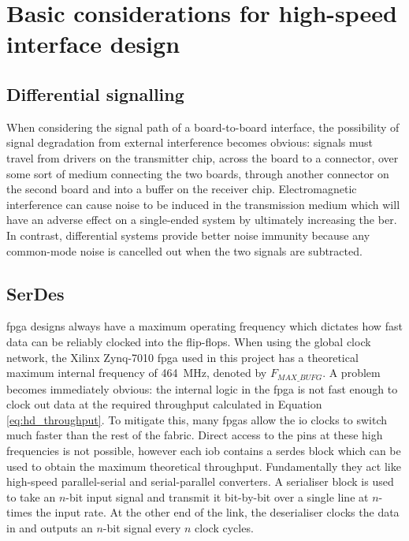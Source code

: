 
\section{Basic considerations for high-speed interface design}

\subsection{Differential signalling}

When considering the signal path of a board-to-board interface, the possibility of signal degradation from external interference becomes obvious: signals must travel from drivers on the transmitter chip, across the board to a connector, over some sort of medium connecting the two boards, through another connector on the second board and into a buffer on the receiver chip. Electromagnetic interference can cause noise to be induced in the transmission medium which will have an adverse effect on a single-ended system by ultimately increasing the \gls{ber}. In contrast, differential systems provide better noise immunity because any common-mode noise is cancelled out when the two signals are subtracted.


\subsection{SerDes}

\gls{fpga} designs always have a maximum operating frequency which dictates how fast data can be reliably clocked into the flip-flops. When using the global clock network, the Xilinx Zynq-7010 \gls{fpga} used in this project has a theoretical maximum internal frequency of \SI{464}{\mega\hertz}, denoted by \(F_{MAX\_BUFG}\)\cite{xilinx:ds187}. A problem becomes immediately obvious: the internal logic in the \gls{fpga} is not fast enough to clock out data at the required throughput calculated in Equation \ref{eq:hd_throughput}. To mitigate this, many \glspl{fpga} allow the \gls{io} clocks to switch much faster than the rest of the fabric. Direct access to the pins at these high frequencies is not possible, however each \gls{iob} contains a \gls{serdes} block which can be used to obtain the maximum theoretical throughput. Fundamentally they act like high-speed parallel-serial and serial-parallel converters. A serialiser block is used to take an \(n\)-bit input signal and transmit it bit-by-bit over a single line at \(n\)-times the input rate. At the other end of the link, the deserialiser clocks the data in and outputs an \(n\)-bit signal every \(n\) clock cycles. 

